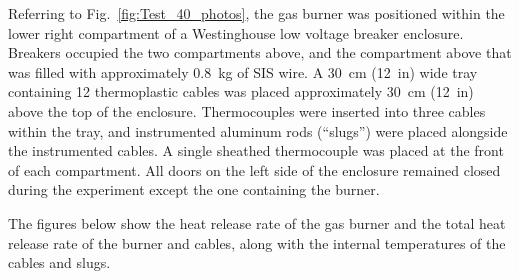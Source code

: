 Referring to Fig.~\ref{fig:Test_40_photos}, the gas burner was positioned within the lower right compartment of a Westinghouse low voltage breaker enclosure. Breakers occupied the two compartments above, and the compartment above that was filled with approximately 0.8~kg of SIS wire. A 30~cm (12~in) wide tray containing 12 thermoplastic cables was placed approximately 30~cm (12~in) above the top of the enclosure. Thermocouples were inserted into three cables within the tray, and instrumented aluminum rods (``slugs'') were placed alongside the instrumented cables. A single sheathed thermocouple was placed at the front of each compartment. All doors on the left side of the enclosure remained closed during the experiment except the one containing the burner.

The figures below show the heat release rate of the gas burner and the total heat release rate of the burner and cables, along with the internal temperatures of the cables and slugs.

